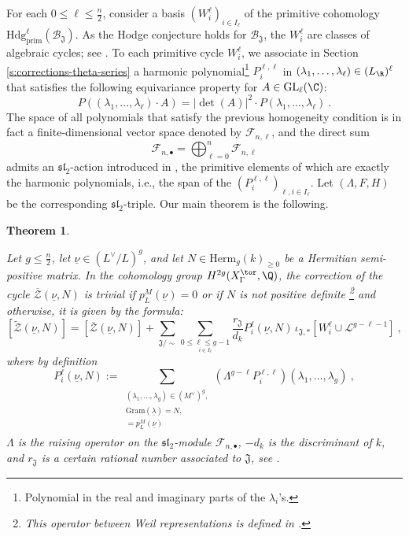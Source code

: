 \documentclass[11pt,letterpaper,english]{amsart}
\numberwithin{equation}{subsection}
\numberwithin{equation}{section}
\newcommand\cB{{\mathcal B}}
\newcommand\cF{{\mathcal F}}
\newcommand\cZ{{\mathcal Z}}
\newcommand\gram{{\mathrm{Gram}}}
\newcommand\fJ{{\mathfrak J}}
\theoremstyle{plain}
\newtheorem{theorem}{Theorem}[section]
\theoremstyle{remark}
\begin{document}
For each $0\leq \ell\leq \frac{n}{2} $, consider a basis $(W_i^\ell)_{i\in I_\ell}$ of the primitive cohomology $\mathrm{Hdg}^{\ell}_{\mathrm{prim}}(\mathcal{B}_\mathfrak{J})$.  As the Hodge conjecture holds for $\cB_\mathfrak J$, the $W_i^\ell$ are classes of algebraic cycles; see . To each primitive cycle $W^\ell_i$,  we associate in Section \ref{s:corrections-theta-series} a harmonic polynomial\footnote{Polynomial in the real and imaginary parts of the $\lambda_i$'s.} $P^{\ell,\ell}_i$ in $(\lambda_1,\ldots,\lambda_\ell)\in (L_\R)^\ell$ that satisfies the following equivariance property for $A\in \mathrm{GL}_\ell(\C)$:
\[P\left((\lambda_1,\ldots,\lambda_\ell)\cdot A\right)=|\det(A)|^2\cdot P(\lambda_1,\ldots,\lambda_\ell)~.\]
The space of all polynomials that satisfy the previous homogeneity condition is in fact a finite-dimensional vector space denoted by $\cF_{n,\ell}$, and the direct sum 
$$\cF_{n,\bullet}=\bigoplus_{\ell=0}^{n}\cF_{n,\ell}$$
admits an $\mathfrak{sl}_2$-action introduced in , the primitive elements of which are exactly the harmonic polynomials, i.e., the span of the $(P_i^{\ell,\ell})_{\ell, i\in I_\ell}$. Let $(\Lambda,F,H)$ be the corresponding $\mathfrak{sl}_2$-triple. Our main theorem is the following.
\begin{theorem}\label{t:main-explicit-form}

Let $g\leq \frac{n}{2}$, let $\underline{\nu}\in (L^\vee/L)^{g}$, and let $N\in\mathrm{Herm}_{g}(k)_{\geq 0}$ be a Hermitian semi-positive matrix. In the cohomology group $H^{2g}(X_\Gamma^{\tor},\Q)$, the correction of the cycle $\overline{\cZ}(\underline{\nu},N)$ is trivial if $p_L^M(\underline{\nu})=0$ or if $N$ is not positive definite \footnote{This operator between Weil representations is defined in .} and otherwise, it is given by the formula:
\[[\widetilde{\cZ}(\underline{\nu},N)]=[\overline{\cZ}(\underline{\nu},N)]+\sum_{\fJ/\sim}\sum_{\underset{i\in I_{\ell}}{0\leq \ell\leq g-1}}\frac{r_\fJ}{d_k}P^\ell_i(\underline{\nu},N) \,\mathfrak \iota_{\fJ,*}[W^\ell_{i}\cup \mathcal{L}^{g-\ell-1}]~,\]
where by definition \[P^\ell_i(\underline{\nu},N):=\sum_{\substack{ (\lambda_1,\ldots,\lambda_g)\in (M^\vee)^g,\\ \gram(\underline \lambda)=N,\\
[\underline \lambda] =p^M_{L}(\underline{\nu})\\}} (\Lambda^{g-\ell}P^{\ell,\ell}_i)(\lambda_1,\ldots,\lambda_g)~,\]
$\Lambda$ is the raising operator on the $\mathfrak{sl}_2$-module $\cF_{n,\bullet}$, $-d_k$ is the discriminant of $k$, and $r_\fJ$ is a certain rational number associated to $\fJ$, see .  
\end{theorem}
\end{document}
